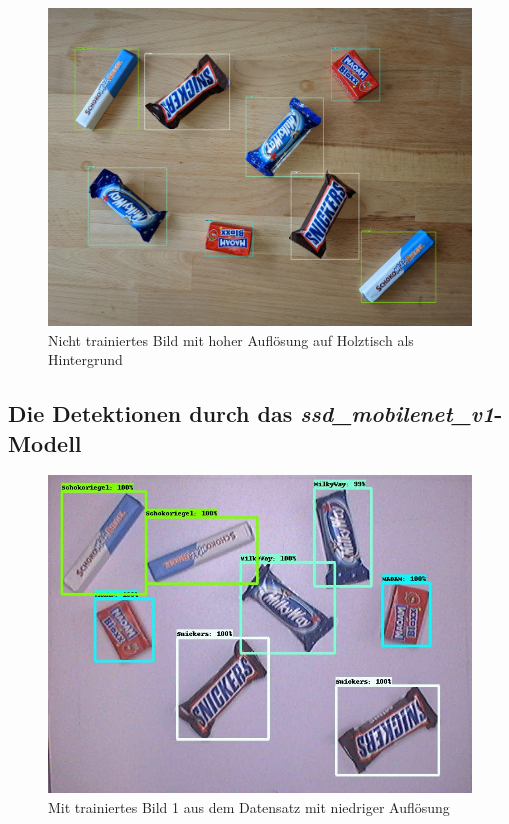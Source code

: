     \begin{figure}[H]
        \centering
        \includegraphics[angle = 90, width = \textwidth]{Bilder/models/model_comparison/faster_rcnn_resnet101_v1_640x640_coco17_tpu-8/HD_on_wood.jpg}
        \caption{Nicht trainiertes Bild mit hoher Auflösung auf Holztisch als Hintergrund}
    \end{figure}
    
    \subsection{Die Detektionen durch das \textit{ssd\_mobilenet\_v1}-Modell}
    
    \begin{figure}[H]
        \vspace{-5mm}
        \centering
        \includegraphics[angle = 90, height = 0.85\textheight]{Bilder/models/model_comparison/ssd_mobilenet_v1_fpn_640x640_coco17_tpu-8/trained_1.jpg}
        \caption{Mit trainiertes Bild 1 aus dem Datensatz mit niedriger Auflösung}
    \end{figure}
    
